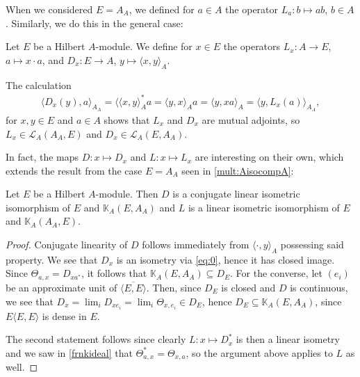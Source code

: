 When we considered $E=A_A$, we defined for $a \in A$ the operator $L_a\colon b \mapsto ab$, $b \in A$. Similarly, we do this in the general case:
\begin{definition}
	Let $E$ be a Hilbert $A$-module. We define for $x \in E$ the operators $L_x\colon A \to E$, $a \mapsto x \cdot a$, and $D_x \colon E \to A$, $y \mapsto \langle x,y\rangle_A$.
\end{definition}
\begin{remark}
The calculation	
\begin{align*}
	\langle D_x(y), a \rangle_{A_A} = \langle \langle x,y\rangle_A^*a = \langle y,x \rangle_A a = \langle y , x a \rangle_A = \langle y, L_x(a)\rangle_{A_A},
\end{align*}
for $x,y \in E$ and $a \in A$ shows that $L_x$ and $D_x$ are mutual adjoints, so $L_x \in \mathcal{L}_A(A_A,E)$ and $D_x \in \mathcal{L}_A(E,A_A)$.
\end{remark}
In fact, the maps $D \colon x \mapsto D_x$ and $L \colon x \mapsto L_x$ are interesting on their own, which extends the result from the case $E=A_A$ seen in \ref{mult:AisocompA}:
\begin{lemma}
	Let $E$ be a Hilbert $A$-module. Then $D$ is a conjugate linear isometric isomorphism of $E$ and $\mathbb{K}_A(E,A_A)$ and $L$ is a linear isometric isomorphism of $E$ and $\mathbb{K}_A(A_A,E)$.
	\label{mult:isocompactgen}
\end{lemma}
\begin{proof}
	Conjugate linearity of $D$ follows immediately from $\langle \cdot, y \rangle_A$ possessing said property. We see that $D_x$ is an isometry via \ref{eq:0}, hence it has closed image. Since $\Theta_{a,x} = D_{x a^*}$, it follows that $\mathbb{K}_A(E,A_A) \subseteq D_{E}$. For the converse, let $(e_i)$ be an approximate unit of $\overline{\langle E,E\rangle}$. Then, since $D_E$ is closed and $D$ is continuous, we see that $D_x=\lim_i D_{xe_i} = \lim_i \Theta_{x,e_i} \in D_E$, hence $D_E \subseteq \mathbb{K}_A(E,A_A)$, since $E \langle E,E\rangle$ is dense in $E$.	
	
	The second statement follows since clearly $L \colon x \mapsto D_x^*$ is then a linear isometry and we saw in \ref{frnkideal} that $\Theta_{a,x}^* = \Theta_{x,a}$, so the argument above applies to $L$ as well.
\end{proof}

